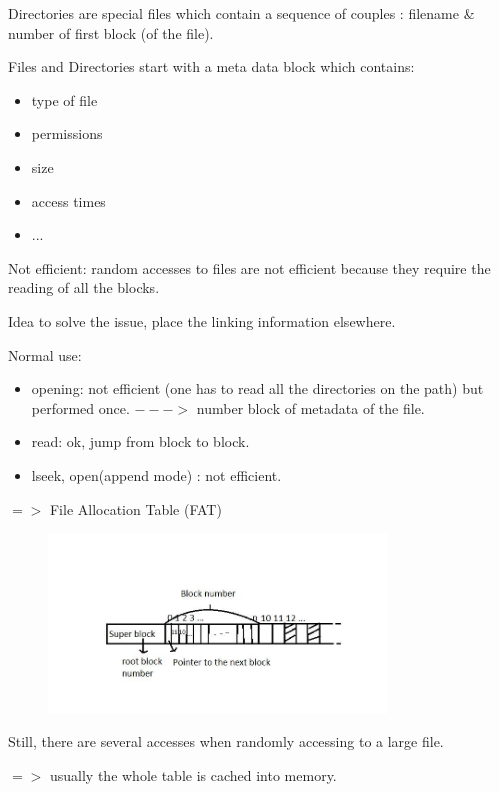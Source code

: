 \documentclass[a4paper,10pt]{report}
\newlength{\larg}
\begin{document}
Directories are special files which contain a sequence of couples : filename \& number of first block (of the file).

Files and Directories start with a meta data block which contains:
\begin{itemize}
  \item type of file
  \item permissions
  \item size
  \item access times
  \item ...
\end{itemize}

Not efficient: random accesses to files are not efficient because they require the reading of all the blocks.

Idea to solve the issue, place the linking information elsewhere.

Normal use:
\begin{itemize}
  \item opening: not efficient (one has to read all the directories on the path) but performed once. $--->$ number block of metadata of the file.
  \item read: ok, jump from block to block.
  \item lseek, open(append mode) :   not efficient.
\end{itemize}

$=>$ File Allocation Table (FAT)

 \begin{figure}[h!]
  \begin{center}
    \includegraphics[width=0.8\textwidth]{fat_2.jpg}
  \end{center}
\end{figure}

Still, there are several accesses when randomly accessing to a large file.

$=>$ usually the whole table is cached into memory.
\end{document}
